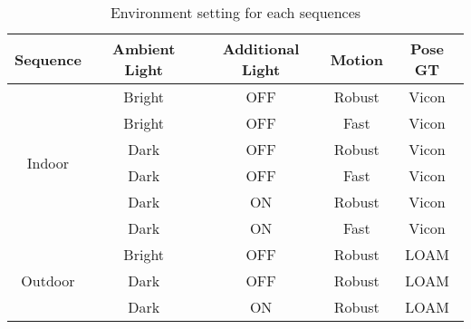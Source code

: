 \begin{table}[t]
	\centering
	\caption{Environment setting for each sequences}
	\begin{tabular}{ccccc}
		\hline
		Sequence                 & Ambient Light & Additional Light & Motion & Pose GT \\ \hline
		\multirow{6}{*}{Indoor}  & Bright              & OFF         & Robust & Vicon   \\ \cline{2-5} 
		& Bright              & OFF         & Fast   & Vicon   \\ \cline{2-5} 
		& Dark                & OFF         & Robust & Vicon   \\ \cline{2-5} 
		& Dark                & OFF         & Fast   & Vicon   \\ \cline{2-5} 
		& Dark                & ON          & Robust & Vicon   \\ \cline{2-5} 
		& Dark                & ON          & Fast   & Vicon   \\ \hline
		\multirow{3}{*}{Outdoor} & Bright              & OFF         & Robust & LOAM    \\ \cline{2-5} 
		& Dark                & OFF         & Robust & LOAM    \\ \cline{2-5} 
		& Dark                & ON          & Robust & LOAM    \\ \hline
	\end{tabular}
\label{tab:sequences}
\end{table}
